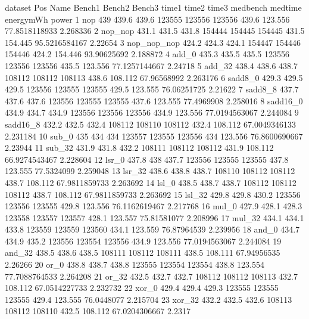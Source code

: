\begin{filecontents}{dataset}
Pos	Name	Bench1	Bench2	Bench3	time1	time2	time3	medbench	medtime	energymWh	power
1	nop	439	439.6	439.6	123555	123556	123556	439.6	123.556	77.8518118933	2.268336
2	nop\_nop	431.1	431.5	431.8	154444	154445	154445	431.5	154.445	95.5216584167	2.22654
3	nop\_nop\_nop	424.2	424.3	424.1	154447	154446	154446	424.2	154.446	93.90625692	2.188872
4	add\_0	435.3	435.5	435.5	123556	123556	123556	435.5	123.556	77.1257144667	2.24718
5	add\_32	438.4	438.6	438.7	108112	108112	108113	438.6	108.112	67.96568992	2.263176
6	sadd8\_0	429.3	429.5	429.5	123556	123555	123555	429.5	123.555	76.06251725	2.21622
7	sadd8\_8	437.7	437.6	437.6	123556	123555	123555	437.6	123.555	77.4969908	2.258016
8	sadd16\_0	434.9	434.7	434.9	123556	123556	123556	434.9	123.556	77.0194563067	2.244084
9	sadd16\_8	432.2	432.5	432.4	108112	108110	108112	432.4	108.112	67.0049346133	2.231184
10	sub\_0	435	434	434	123557	123555	123556	434	123.556	76.8600690667	2.23944
11	sub\_32	431.9	431.8	432.2	108111	108112	108112	431.9	108.112	66.9274543467	2.228604
12	lsr\_0	437.8	438	437.7	123556	123555	123555	437.8	123.555	77.5324099	2.259048
13	lsr\_32	438.6	438.8	438.7	108110	108112	108112	438.7	108.112	67.9811859733	2.263692
14	lsl\_0	438.5	438.7	438.7	108112	108112	108112	438.7	108.112	67.9811859733	2.263692
15	lsl\_32	429.8	429.8	430.2	123556	123556	123555	429.8	123.556	76.1162619467	2.217768
16	mul\_0	427.9	428.1	428.3	123558	123557	123557	428.1	123.557	75.81581077	2.208996
17	mul\_32	434.1	434.1	433.8	123559	123559	123560	434.1	123.559	76.87964539	2.239956
18	and\_0	434.7	434.9	435.2	123556	123554	123556	434.9	123.556	77.0194563067	2.244084
19	and\_32	438.5	438.6	438.5	108111	108112	108111	438.5	108.111	67.94956535	2.26266
20	or\_0	438.8	438.7	438.8	123555	123554	123554	438.8	123.554	77.7088764533	2.264208
21	or\_32	432.5	432.7	432.7	108112	108112	108113	432.7	108.112	67.0514227733	2.232732
22	xor\_0	429.4	429.4	429.3	123555	123555	123555	429.4	123.555	76.0448077	2.215704
23	xor\_32	432.2	432.5	432.6	108113	108112	108110	432.5	108.112	67.0204306667	2.2317
\end{filecontents}


